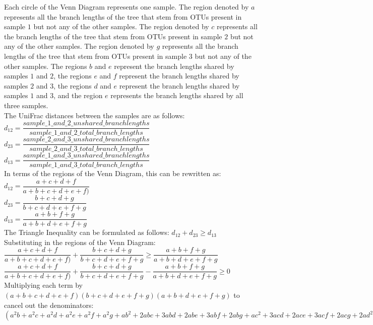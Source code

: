 \documentclass[10pt,letterpaper]{article}
\begin{document}
Each circle of the Venn Diagram represents one sample. The region denoted by $a$ represents all the branch lengths of the tree that stem from OTUs present in sample $1$ but not any of the other samples. The region denoted by $c$ represents all the branch lengths of the tree that stem from OTUs present in sample $2$ but not any of the other samples. The region denoted by $g$ represents all the branch lengths of the tree that stem from OTUs present in sample $3$ but not any of the other samples. The regions $b$ and $e$ represent the branch lengths shared by samples $1$ and $2$, the regions $e$ and $f$ represent the branch lengths shared by samples $2$ and $3$, the regions $d$ and $e$ represent the branch lengths shared by samples $1$ and $3$, and the region $e$ represents the branch lengths shared by all three samples.\\[3ex]
The UniFrac distances between the samples are as follows:\\[1ex]
$d_{12} = \dfrac{sample\_1\_ and\_2\_unshared\_branch lengths}{sample\_1\_and\_2\_total\_branch\_lengths}$\\[1ex]
$d_{23} = \dfrac{sample\_2\_ and\_3\_unshared\_branch lengths}{sample\_2\_and\_3\_total\_branch\_lengths}$\\[1ex]
$d_{13} = \dfrac{sample\_1\_ and\_3\_unshared\_branch lengths}{sample\_1\_and\_3\_total\_branch\_lengths}$\\[3ex]
In terms of the regions of the Venn Diagram, this can be rewritten as:\\[1ex]
$d_{12} = \dfrac{a+c+d+f}{a+b+c+d+e+f)}$\\[1ex]
$d_{23} = \dfrac{b+c+d+g}{b+c+d+e+f+g}$\\[1ex]
$d_{13} = \dfrac{a+b+f+g}{a+b+d+e+f+g}$\\[3ex]
The Triangle Inequality can be formulated as follows:
$d_{12} + d_{23} \ge d_{13}$\\[3ex]
Substituting in the regions of the Venn Diagram:\\[1ex]
$\dfrac{a+c+d+f}{a+b+c+d+e+f)} + \dfrac{b+c+d+g}{b+c+d+e+f+g} \ge \dfrac{a+b+f+g}{a+b+d+e+f+g}$\\[1ex]
$\dfrac{a+c+d+f}{a+b+c+d+e+f)} + \dfrac{b+c+d+g}{b+c+d+e+f+g} - \dfrac{a+b+f+g}{a+b+d+e+f+g} \ge 0$\\[3ex]
Multiplying each term by $(a+b+c+d+e+f)(b+c+d+e+f+g)(a+b+d+e+f+g)$ to cancel out the denominators:
$(a^2b + a^2c + a^2d + a^2e + a^2f + a^2g + ab^2 + 2abc + 3abd + 2abe + 3abf + 2abg + ac^2 + 3acd + 2ace + 3acf + 2acg + 2ad^2 + 3ade + 4adf + 3adg + ae^2 + 3aef + 2aeg + 2af^2 + 3afg + ag^2 + b^2c + b^2d + b^2f + bc^2 + 3bcd + 2bce + 3bcf + 2bcg + 2bd^2 + 2bde + 4bdf + 2bdg + 2bef + 2bf^2 + 2bfg + c^2d + c^2e + c^2f + c^2g + 2cd^2 + 3cde + 4cdf + 3cdg + ce^2 + 3cef + 2ceg + 2cf^2 + 3cfg + cg^2 + d^3 + 2d^2e + 3d^2f + 2d^2g + de^2 + 4def + 2deg + 3df^2 + 4dfg + dg^2 + e^2f + 2ef^2 + 2efg + f^3 + 2f^2g + fg^2) +$\\[1ex]
\end{document}
